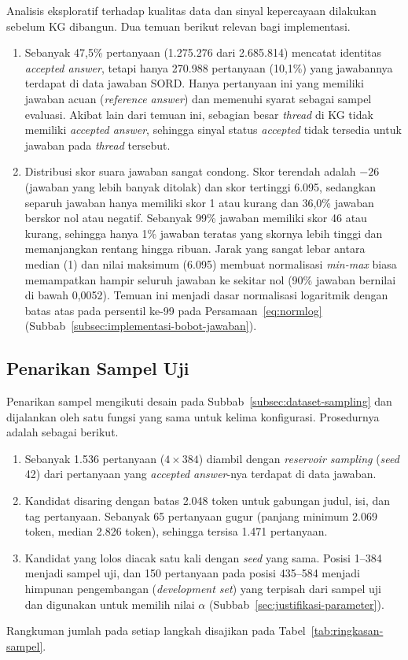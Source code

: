 Analisis eksploratif terhadap kualitas data dan sinyal kepercayaan dilakukan sebelum KG dibangun. Dua temuan berikut relevan bagi implementasi.
\begin{enumerate}
    \item Sebanyak 47,5\% pertanyaan (1.275.276 dari 2.685.814) mencatat identitas \emph{accepted answer}, tetapi hanya 270.988 pertanyaan (10,1\%) yang jawabannya terdapat di data jawaban SORD. Hanya pertanyaan ini yang memiliki jawaban acuan (\emph{reference answer}) dan memenuhi syarat sebagai sampel evaluasi. Akibat lain dari temuan ini, sebagian besar \emph{thread} di KG tidak memiliki \emph{accepted answer}, sehingga sinyal status \emph{accepted} tidak tersedia untuk jawaban pada \emph{thread} tersebut.
    \item Distribusi skor suara jawaban sangat condong. Skor terendah adalah $-26$ (jawaban yang lebih banyak ditolak) dan skor tertinggi 6.095, sedangkan separuh jawaban hanya memiliki skor 1 atau kurang dan 36,0\% jawaban berskor nol atau negatif. Sebanyak 99\% jawaban memiliki skor 46 atau kurang, sehingga hanya 1\% jawaban teratas yang skornya lebih tinggi dan memanjangkan rentang hingga ribuan. Jarak yang sangat lebar antara median (1) dan nilai maksimum (6.095) membuat normalisasi \emph{min-max} biasa memampatkan hampir seluruh jawaban ke sekitar nol (90\% jawaban bernilai di bawah 0,0052). Temuan ini menjadi dasar normalisasi logaritmik dengan batas atas pada persentil ke-99 pada Persamaan~\eqref{eq:normlog} (Subbab~\ref{subsec:implementasi-bobot-jawaban}).
\end{enumerate}

\subsection{Penarikan Sampel Uji}
\label{subsec:data-sampel-uji}

Penarikan sampel mengikuti desain pada Subbab~\ref{subsec:dataset-sampling} dan dijalankan oleh satu fungsi yang sama untuk kelima konfigurasi. Prosedurnya adalah sebagai berikut.
\begin{enumerate}
    \item Sebanyak 1.536 pertanyaan ($4 \times 384$) diambil dengan \emph{reservoir sampling} (\emph{seed} 42) dari pertanyaan yang \emph{accepted answer}-nya terdapat di data jawaban.
    \item Kandidat disaring dengan batas 2.048 token untuk gabungan judul, isi, dan tag pertanyaan. Sebanyak 65 pertanyaan gugur (panjang minimum 2.069 token, median 2.826 token), sehingga tersisa 1.471 pertanyaan.
    \item Kandidat yang lolos diacak satu kali dengan \emph{seed} yang sama. Posisi 1--384 menjadi sampel uji, dan 150 pertanyaan pada posisi 435--584 menjadi himpunan pengembangan (\emph{development set}) yang terpisah dari sampel uji dan digunakan untuk memilih nilai $\alpha$ (Subbab~\ref{sec:justifikasi-parameter}).
\end{enumerate}
Rangkuman jumlah pada setiap langkah disajikan pada Tabel~\ref{tab:ringkasan-sampel}.

